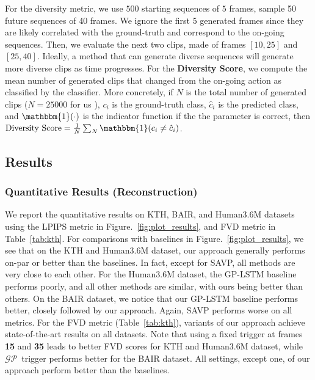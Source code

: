 \documentclass{article} \usepackage{iclr2021_conference,times}
\newcommand{\GP}{$\mathcal{GP}$}
\begin{document}
For the diversity metric, we use $500$ starting sequences of $5$ frames, sample 50 future sequences of 40 frames. We ignore the first 5 generated frames since they are likely correlated with the ground-truth and correspond to the on-going sequences. Then, we evaluate the next two clips, made of frames $[10,25]$ and $[25,40]$. Ideally, a method that can generate diverse sequences will generate more diverse clips as time progresses. For the \textbf{Diversity Score}, we compute the mean number of generated clips that changed from the on-going action as classified by the classifier. More concretely, if $N$ is the total number of generated clips ($N=25000$ for us 
), $c_i$ is the ground-truth class, $\hat{c}_i$ is the predicted class, and $\mathbbm{1}(\cdot)$ is the indicator function if the the parameter is correct, then $\text{Diversity Score} = \frac{1}{N} \sum_N \mathbbm{1}(c_i \ne \hat{c}_i)$.


\subsection{Results}
\label{sec:results}
\vspace{-0.05in}
\subsubsection{Quantitative Results (Reconstruction)} 
\vspace{-0.05in}
We report the quantitative results on KTH, BAIR, and Human3.6M datasets using the LPIPS metric in Figure.~\ref{fig:plot_results}, and FVD metric in Table~\ref{tab:kth}. For comparisons with baselines in Figure.~\ref{fig:plot_results}, we see that on the KTH and Human3.6M dataset, our approach generally performs on-par or better than the baselines. In fact, except for SAVP, all methods are very close to each other. For the Human3.6M dataset, the GP-LSTM baseline performs poorly, and all other methods are similar, with ours being better than others. On the BAIR dataset, we notice that our GP-LSTM baseline performs better, closely followed by our approach. Again, SAVP performs worse on all metrics. For the FVD metric (Table~\ref{tab:kth}), variants of our approach achieve state-of-the-art results on all datasets. Note that using a fixed trigger at frames \textbf{15} and \textbf{35} leads to better FVD scores for KTH and Human3.6M dataset, while \GP\ trigger performs better for the BAIR dataset. All settings, except one, of our approach perform better than the baselines.
\end{document}
